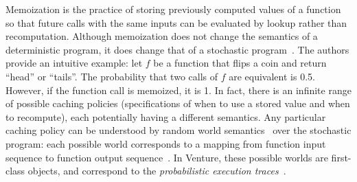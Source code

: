 Memoization is the practice of storing previously computed values of a function so that future calls with the same inputs can be evaluated by lookup rather than recomputation.
Although memoization does not change the semantics of a deterministic program, it does change that of a stochastic program~\citep{goodman2008church}. The authors provide an intuitive example: let $f$ be a function that flips a coin and return ``head'' or ``tails''. The probability that two calls of $f$ are equivalent is 0.5. However, if the function call is memoized, it is 1.
In fact, there is an infinite range of possible caching policies (specifications of when to use a stored value and when to recompute), each potentially having a different semantics.
Any particular caching policy can be understood by random world semantics~\citep{poole1993probabilistic,sato1995statistical} over the stochastic program: each possible world corresponds to a mapping from function input sequence to function output sequence~\citep{mcallester2008random}.
In Venture, these possible worlds are first-class objects, and correspond to the {\em probabilistic execution traces}~\citep{mansinghka2014venture}.

